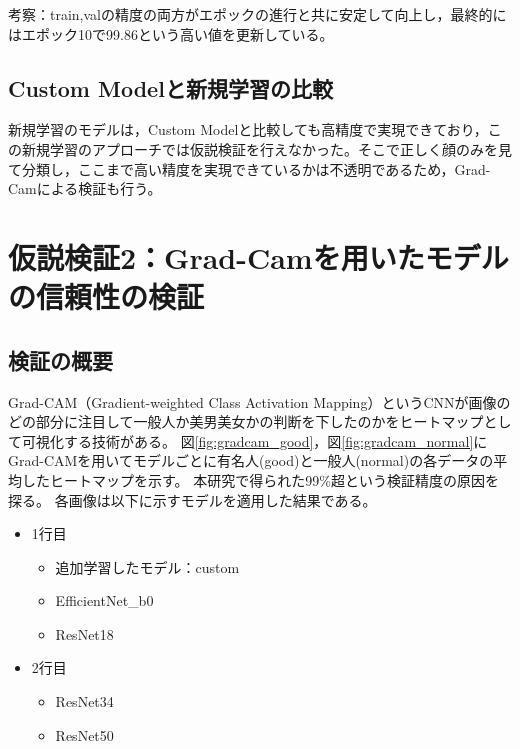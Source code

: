 \documentclass[a4paper,11pt,titlepage]{jsarticle}
\begin{document}
考察：train,valの精度の両方がエポックの進行と共に安定して向上し，最終的にはエポック10で99.86という高い値を更新している。
\subsection{Custom Modelと新規学習の比較}

新規学習のモデルは，Custom Modelと比較しても高精度で実現できており，この新規学習のアプローチでは仮説検証を行えなかった。そこで正しく顔のみを見て分類し，ここまで高い精度を実現できているかは不透明であるため，Grad-Camによる検証も行う。


\section{仮説検証2：Grad-Camを用いたモデルの信頼性の検証}
\subsection{検証の概要}
Grad-CAM（Gradient-weighted Class Activation Mapping）というCNNが画像のどの部分に注目して一般人か美男美女かの判断を下したのかをヒートマップとして可視化する技術がある。
図\ref{fig:gradcam_good}，図\ref{fig:gradcam_normal}にGrad-CAMを用いてモデルごとに有名人(good)と一般人(normal)の各データの平均したヒートマップを示す。
本研究で得られた99\%超という検証精度の原因を探る。
各画像は以下に示すモデルを適用した結果である。
\begin{itemize}
	\item 1行目
	\begin{itemize}
	\item 追加学習したモデル：custom
	\item EfficientNet\_b0
	\item ResNet18
	\end{itemize}
	\item 2行目
	\begin{itemize}
	\item ResNet34
	\item ResNet50
	\end{itemize}
\end{itemize}
\end{document}
